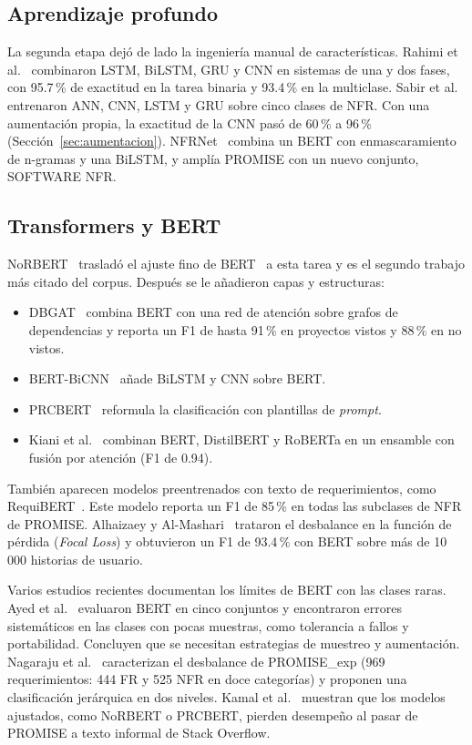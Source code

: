 \documentclass[conference]{IEEEtran}
\begin{document}
\subsection{Aprendizaje profundo}
La segunda etapa dejó de lado la ingeniería manual de características. Rahimi et al.~\cite{Rahimi2021-TwoPhase} combinaron LSTM, BiLSTM, GRU y CNN en sistemas de una y dos fases, con 95.7\,\% de exactitud en la tarea binaria y 93.4\,\% en la multiclase. Sabir et al.~\cite{Sabir2021-DeepLearning} entrenaron ANN, CNN, LSTM y GRU sobre cinco clases de NFR. Con una aumentación propia, la exactitud de la CNN pasó de 60\,\% a 96\,\% (Sección~\ref{sec:aumentacion}). NFRNet~\cite{Li2021-NFRNet,Li2022-Automatically} combina un BERT con enmascaramiento de n-gramas y una BiLSTM, y amplía PROMISE con un nuevo conjunto, SOFTWARE NFR.

\subsection{Transformers y BERT}
NoRBERT~\cite{Hey2020-NoRBERT} trasladó el ajuste fino de BERT~\cite{Devlin2019-BERT} a esta tarea y es el segundo trabajo más citado del corpus. Después se le añadieron capas y estructuras:
\begin{itemize}
  \item DBGAT~\cite{Li2022-Automatic} combina BERT con una red de atención sobre grafos de dependencias y reporta un F1 de hasta 91\,\% en proyectos vistos y 88\,\% en no vistos.
  \item BERT-BiCNN~\cite{Kaur2023-Improving} añade BiLSTM y CNN sobre BERT.
  \item PRCBERT~\cite{Luo2022-PRCBERT} reformula la clasificación con plantillas de \emph{prompt}.
  \item Kiani et al.~\cite{Kiani2026-DeepLearning} combinan BERT, DistilBERT y RoBERTa en un ensamble con fusión por atención (F1 de 0.94).
\end{itemize}
También aparecen modelos preentrenados con texto de requerimientos, como RequiBERT~\cite{Rahman2026-RequiBERT}. Este modelo reporta un F1 de 85\,\% en todas las subclases de NFR de PROMISE. Alhaizaey y Al-Mashari~\cite{Alhaizaey2025-AgilePLM} trataron el desbalance en la función de pérdida (\emph{Focal Loss}) y obtuvieron un F1 de 93.4\,\% con BERT sobre más de 10\,000 historias de usuario.

Varios estudios recientes documentan los límites de BERT con las clases raras. Ayed et al.~\cite{Ayed2025-Benchmarking} evaluaron BERT en cinco conjuntos y encontraron errores sistemáticos en las clases con pocas muestras, como tolerancia a fallos y portabilidad. Concluyen que se necesitan estrategias de muestreo y aumentación. Nagaraju et al.~\cite{Nagaraju2026-Hierarchical} caracterizan el desbalance de PROMISE\_exp (969 requerimientos: 444 FR y 525 NFR en doce categorías) y proponen una clasificación jerárquica en dos niveles. Kamal et al.~\cite{Kamal2025-Robust} muestran que los modelos ajustados, como NoRBERT o PRCBERT, pierden desempeño al pasar de PROMISE a texto informal de Stack Overflow.
\end{document}
